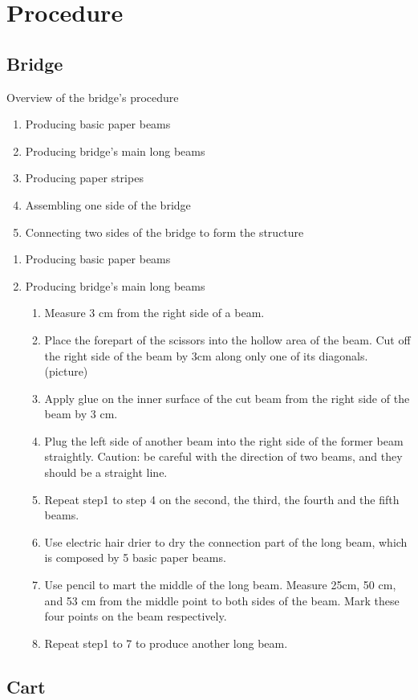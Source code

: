 \section{Procedure}
\subsection{Bridge}
Overview of the bridge’s procedure
\begin{enumerate}
\item Producing basic paper beams 
\item Producing bridge’s main long beams
\item Producing paper stripes
\item Assembling one side of the bridge
\item Connecting two sides of the bridge to form the structure
\end{enumerate}

\begin{enumerate}
\item Producing basic paper beams
\item Producing bridge’s main long beams
\begin{enumerate}
\item Measure 3 cm from the right side of a beam.
\item Place the forepart of the scissors into the hollow area of the beam. Cut off the right side of the beam by 3cm along only one of its diagonals.
(picture)
\item Apply glue on the inner surface of the cut beam from the right side of the beam by 3 cm.
\item Plug the left side of another beam into the right side of the former beam straightly. 
Caution: be careful with the direction of two beams, and they should be a straight line. 
\item Repeat step1 to step 4 on the second, the third, the fourth and the fifth beams. 
\item Use electric hair drier to dry the connection part of the long beam, which is composed by 5 basic paper beams. 
\item Use pencil to mart the middle of the long beam. Measure 25cm, 50 cm, and 53 cm from the middle point to both sides of the beam. Mark these four points on the beam respectively. 
\item Repeat step1 to 7 to produce another long beam. 

\end{enumerate}
\end{enumerate}




\subsection{Cart}